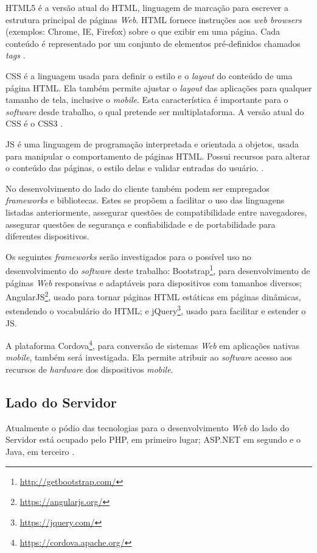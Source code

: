 HTML5 é a versão atual do HTML, linguagem de marcação para escrever a estrutura principal de páginas \textit{Web}. HTML fornece instruções aos \textit{web browsers} (exemplos: Chrome, IE, Firefox) sobre o que exibir em uma página. Cada conteúdo é representado por um conjunto de elementos pré-definidos chamados \textit{tags} \cite{html5}. \par 

CSS é a linguagem usada para definir o estilo e o \textit{layout} do conteúdo de uma página HTML. Ela também permite ajustar o \textit{layout} das aplicações para qualquer tamanho de tela, inclusive o \textit{mobile}. Esta característica é importante para o \textit{software} desde trabalho, o qual pretende ser multiplataforma. A versão atual do CSS é o CSS3 \cite{css3}. \par
 
JS é uma linguagem de programação interpretada e orientada a objetos, usada para manipular o comportamento de páginas HTML. Possui recursos para alterar o conteúdo das páginas, o estilo delas e validar entradas do usuário. \cite{javascript}. \par

No desenvolvimento do lado do cliente também podem ser empregados \textit{frameworks} e bibliotecas. Estes se propõem a facilitar o uso das linguagens listadas anteriormente, assegurar questões de compatibilidade entre navegadores, assegurar questões de segurança e confiabilidade e de portabilidade para diferentes dispositivos. \par

Os seguintes \textit{frameworks} serão investigados para o possível uso no desenvolvimento do \textit{software} deste trabalho: Bootstrap\footnote{\url{http://getbootstrap.com/}}, para desenvolvimento de páginas \textit{Web} responsivas e adaptáveis para dispositivos com tamanhos diversos; AngularJS\footnote{\url{https://angularjs.org/}}, usado para tornar páginas HTML estáticas em páginas dinâmicas, estendendo o vocabulário do HTML; e jQuery\footnote{\url{https://jquery.com/}}, usado para facilitar e estender o JS. \par
 
A plataforma Cordova\footnote{\url{https://cordova.apache.org/}}, para conversão de sistemas \textit{Web} em aplicações nativas \textit{mobile}, também será investigada. Ela permite atribuir ao \textit{software} acesso aos recursos de \textit{hardware} dos dispositivos \textit{mobile}.

\subsection{Lado do Servidor} \label{sec:server}
Atualmente o pódio das tecnologias para o desenvolvimento \textit{Web} do lado do Servidor está ocupado pelo PHP, em primeiro lugar; ASP.NET em segundo e o Java, em terceiro \cite{w3techs2015}. \par

